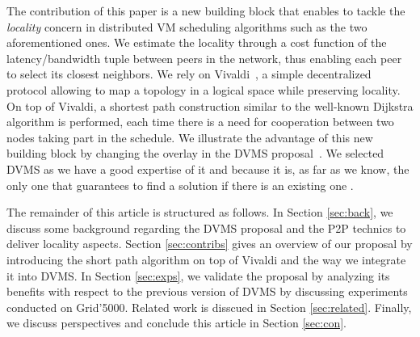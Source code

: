 The contribution of this paper is a new building block  that enables to tackle
the \emph{locality} concern in distributed VM scheduling algorithms such as the two aforementioned ones. 
We estimate the locality through a cost function of the latency/bandwidth tuple
between peers in the network, thus enabling each peer to select its closest
neighbors. We rely on Vivaldi~\cite{dabek:2001:sigcomm04}, a simple decentralized
protocol allowing to map a topology in a logical space while preserving
locality.  On top of Vivaldi, a shortest path construction similar to the
well-known Dijkstra algorithm is performed, each time there is a need for
cooperation between two nodes taking part in the schedule. 
We illustrate the advantage of this new building block by  changing the overlay in the
DVMS proposal~\cite{quesnel:cpe2012}.  We selected DVMS  as we have a good
expertise of it and because it is, as far as we know, the only one that
guarantees to find a solution if there is an existing one \cite{quesnel:ispa2013}.
                                                   
The remainder of this article is structured as follows. In Section \ref{sec:back}, we
discuss some background regarding the DVMS proposal and the P2P technics to
deliver locality aspects.  Section \ref{sec:contribs} gives an overview of our proposal by
introducing the short path algorithm on top of  Vivaldi and the way we
integrate it into DVMS.  In Section \ref{sec:exps}, we validate the proposal by analyzing
its benefits with respect to the previous version of DVMS by discussing experiments conducted on Grid'5000. Related work is
disscued in Section \ref{sec:related}. Finally, we discuss perspectives and conclude this
article in Section \ref{sec:con}. 

